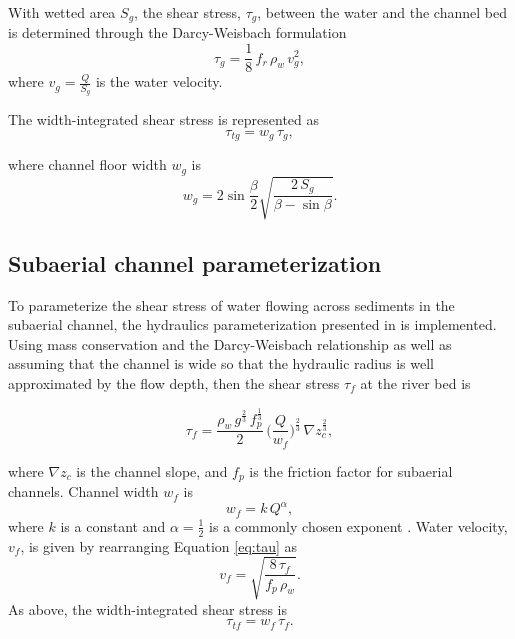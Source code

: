 \documentclass[draft]{agujournal2019}
\begin{document}
With wetted area $S_g$, the shear stress, $\tau_g$, between the water and the channel bed is determined through the Darcy-Weisbach formulation
\begin{equation}
  \label{eq:tau}
  \tau_g=\frac{1}{8}\,f_r\,\rho_w\,v_g^2,
\end{equation}
%
where $v_g = \frac{Q}{S_g}$ is the water velocity.

The width-integrated shear stress is represented as
\begin{equation}
  \label{eq:tautg}
  \tau_{tg}=w_g\,\tau_g,
\end{equation}

where  channel floor width $w_g$ is
\begin{equation}
  \label{eq:dh2wc}
  w_g = 2  \sin \frac{\beta}{2} \sqrt{\frac{2\, S_g}{\beta -\sin \beta}}.
\end{equation}

\subsection{Subaerial channel  parameterization}
\label{sect:fluv}

To parameterize the shear stress of water flowing across sediments in the subaerial channel, the hydraulics parameterization presented in  is implemented.
Using mass conservation and the Darcy-Weisbach relationship as well as assuming that the channel is wide so that the hydraulic radius is well approximated by the flow depth, then
the shear stress $\tau_f$ at the river bed is
\begin{linenomath*}
  \begin{equation}
    \label{eq:DW_tau}
    \tau_f=\frac{\rho_w\,g^{\frac{2}{3}}\,f_p^{\frac{1}{3}}}{2}\, \Big(\frac{Q}{w_f} \Big)^{\frac{2}{3}} \,\nabla z_c^{\frac{2}{3}},
  \end{equation}
\end{linenomath*}
where $\nabla z_c$ is the channel slope, and $f_p$ is the friction factor for subaerial channels.
Channel width $w_f$ is
\begin{equation}
  \label{eq:wcf}
  w_f = k \, Q^{\alpha},
\end{equation}
%
where $k$ is a constant and $\alpha=\frac{1}{2}$ is a commonly chosen exponent \cite{leopold1953}.
Water velocity, $v_f$, is given by rearranging Equation \ref{eq:tau} as
\begin{equation}
  \label{eq:vf}
  v_f = \sqrt{\frac{8\,\tau_f}{f_p\,\rho_w}}.
\end{equation}
%
As above, the width-integrated shear stress is
\begin{equation}
    \label{eq:tautf}
    \tau_{tf}=w_f\,\tau_f.
  \end{equation}
\end{document}
